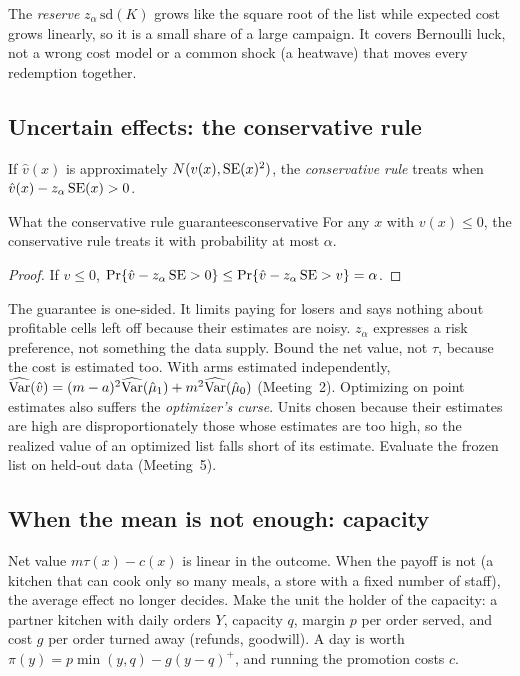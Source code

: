 \documentclass[11pt]{article}
\begin{document}
The \emph{reserve} $z_\alpha\,\text{sd}(K)$ grows like the square root of the list while expected cost grows linearly, so it is a
small share of a large campaign. It covers Bernoulli luck, not a wrong cost model or a common shock (a heatwave) that moves
every redemption together.

\subsection{Uncertain effects: the conservative rule}

If $\hat v(x)$ is approximately $N(v(x), \operatorname{SE}(x)^2)$, the \emph{conservative rule} treats when
$\hat v(x) - z_\alpha\operatorname{SE}(x) > 0$.

\begin{prop}{What the conservative rule guarantees}{conservative}
For any $x$ with $v(x) \le 0$, the conservative rule treats it with probability at most $\alpha$.
\end{prop}
\begin{proof}
If $v \le 0$, $\Pr\{\hat v - z_\alpha\operatorname{SE} > 0\} \le \Pr\{\hat v - z_\alpha\operatorname{SE} > v\} = \alpha$.
\end{proof}

The guarantee is one-sided. It limits paying for losers and says nothing about profitable cells left off because
their estimates are noisy. $z_\alpha$ expresses a risk preference, not something the data supply. Bound the net value, not
$\tau$, because the cost is estimated too. With arms estimated independently, $\widehat{\operatorname{Var}}(\hat v) = (m - a)^2\widehat{\operatorname{Var}}(\hat\mu_1) + m^2\widehat{\operatorname{Var}}(\hat\mu_0)$ (Meeting~2). Optimizing
on point estimates also suffers the \emph{optimizer's curse}. Units chosen because their estimates are high are
disproportionately those whose estimates are too high, so the realized value of an optimized list falls short of its
estimate. Evaluate the frozen list on held-out data (Meeting~5).

\subsection{When the mean is not enough: capacity}

Net value $m\tau(x) - c(x)$ is linear in the outcome. When the payoff is not (a kitchen that can cook only so many meals,
a store with a fixed number of staff), the average effect no longer decides. Make the unit the holder of the capacity: a
partner kitchen with daily orders $Y$, capacity $q$, margin $p$ per order served, and cost $g$ per order turned away
(refunds, goodwill). A day is worth $\pi(y) = p\min(y, q) - g(y - q)^+$, and running the promotion costs $c$.
\end{document}
